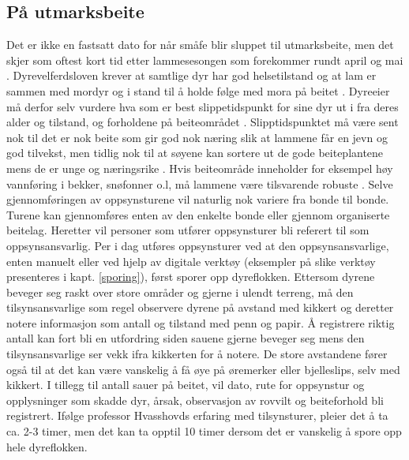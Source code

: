 \subsection{På utmarksbeite}
Det er ikke en fastsatt dato for når småfe blir sluppet til utmarksbeite, men det skjer som oftest kort tid etter lammesesongen som forekommer rundt april og mai \cite{yrehagen2015BeiteUtmark}. Dyrevelferdsloven krever at samtlige dyr har god helsetilstand og at lam er sammen med mordyr og i stand til å holde følge med mora på beitet \cite{2005ForskriftSmafe}. Dyreeier må derfor selv vurdere hva som er best slippetidspunkt for sine dyr ut i fra deres alder og tilstand, og forholdene på beiteområdet \cite{NorskSauogGeitRiktigSlippetidspunkt}. Slipptidspunktet må være sent nok til det er nok beite som gir god nok næring slik at lammene får en jevn og god tilvekst, men tidlig nok til at søyene kan sortere ut de gode beiteplantene mens de er unge og næringsrike \cite[~s.8]{RekdalTemahefteSau}. Hvis beiteområde inneholder for eksempel høy vannføring i bekker, snøfonner o.l, må lammene være tilsvarende robuste \cite{NorskSauogGeitRiktigSlippetidspunkt}. 
\newline
\newline
Selve gjennomføringen av oppsynsturene vil naturlig nok variere fra bonde til bonde. Turene kan gjennomføres enten av den enkelte bonde eller gjennom organiserte beitelag. Heretter vil personer som utfører oppsynsturer bli referert til som oppsynsansvarlig. Per i dag utføres oppsynsturer ved at den oppsynsansvarlige, enten manuelt eller ved hjelp av digitale verktøy (eksempler på slike verktøy presenteres i kapt. \ref{sporing}), først sporer opp dyreflokken. Ettersom dyrene beveger seg raskt over store områder og gjerne i ulendt terreng, må den tilsynsansvarlige som regel observere dyrene på avstand med kikkert og deretter notere informasjon som antall og tilstand med penn og papir. Å registrere riktig antall kan fort bli en utfordring siden sauene gjerne beveger seg mens den tilsynsansvarlige ser vekk ifra kikkerten for å notere. De store avstandene fører også til at det kan være vanskelig å få øye på øremerker eller bjelleslips, selv med kikkert. I tillegg til antall sauer på beitet, vil dato, rute for oppsynstur og opplysninger som skadde dyr, årsak, observasjon av rovvilt og beiteforhold bli registrert. Ifølge professor Hvasshovds erfaring med tilsynsturer, pleier det å ta ca. 2-3 timer, men det kan ta opptil 10 timer dersom det er vanskelig å spore opp hele dyreflokken. 

